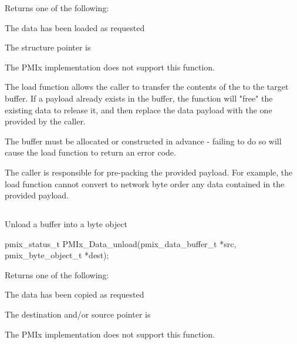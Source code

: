 Returns one of the following:
\begin{constantdesc}
\item {} The data has been loaded as requested
\item {} The  structure pointer is 
\item {} The \ac{PMIx} implementation does not support this function.
\end{constantdesc}

\descr

The load function allows the caller to transfer the contents of the 
 to the  target buffer. If a payload
already exists in the buffer, the function will "free" the existing data to
release it, and then replace the data payload with the one provided
by the caller.

\adviceuserstart
The buffer must be allocated or constructed in advance - failing to do so
will cause the load function to return an error code.

The caller is responsible for pre-packing the provided
payload. For example, the load function cannot convert to network byte order
any data contained in the provided payload.
\adviceuserend

\subsection{}

\summary

Unload a buffer into a byte object

\format

\cspecificstart
\begin{codepar}
pmix_status_t
PMIx_Data_unload(pmix_data_buffer_t *src,
                 pmix_byte_object_t *dest);
\end{codepar}
\cspecificend

\begin{arglist}
\end{arglist}

Returns one of the following:
\begin{constantdesc}
\item {} The data has been copied as requested
\item {} The destination and/or source pointer is 
\item {} The \ac{PMIx} implementation does not support this function.
\end{constantdesc}

